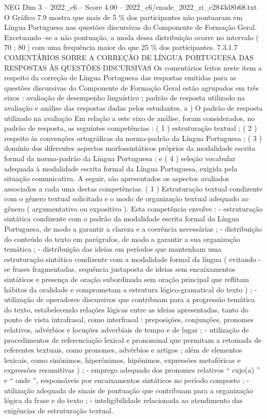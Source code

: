 \begin{textsample}{NEG Dim 3 – 2022\_c6 – Score 4.00 – 2022\_c6/enade\_2022\_ri\_c2843d8b68.txt}
O Gráfico 7.9 mostra que mais de 5 \% dos participantes não pontuaram em Língua Portuguesa nas questões discursivas do Componente de Formação Geral.
Excetuando -se a não pontuação, a moda dessa distribuição ocorre no intervalo ( 70 ; 80 ] com uma frequência maior do que 25 \% dos participantes. 7.3.1.7 COMENTÁRIOS SOBRE A CORREÇÃO DE LÍNGUA PORTUGUESA DAS RESPOSTAS ÀS QUESTÕES DISCURSIVAS Os comentários feitos neste item a respeito da correção de Língua Portuguesa das respostas emitidas para as questões discursivas do Componente de Formação Geral estão agrupados em três eixos : avaliação de desempenho linguístico ; padrão de resposta utilizado na avaliação e análise das respostas dadas pelos estudantes. a ) O padrão de resposta utilizado na avaliação Em relação a este eixo de análise, foram considerados, no padrão de resposta, as seguintes competências : ( 1 ) estruturação textual ; ( 2 ) respeito às convenções ortográficas da norma-padrão da Língua Portuguesa ; ( 3 ) domínio dos diferentes aspectos morfossintáticos próprios da modalidade escrita formal da norma-padrão da Língua Portuguesa ; e ( 4 ) seleção vocabular adequada à modalidade escrita formal da Língua Portuguesa, exigida pela situação comunicativa.
A seguir, são apresentados os aspectos avaliados associados a cada uma destas competências. ( 1 ) Estruturação textual condizente com o gênero textual solicitado e o modo de organização textual adequado ao gênero ( argumentativo ou expositivo ).
Esta competência envolve : - estruturação sintática condizente com o padrão da modalidade escrita formal da Língua Portuguesa, de modo a garantir a clareza e a coerência necessárias ; - distribuição do conteúdo do texto em parágrafos, de modo a garantir a sua organização temática ; - distribuição das ideias em períodos que mantenham uma estruturação sintática condizente com a modalidade formal da língua ( evitando -se frases fragmentadas, sequência justaposta de ideias sem encaixamentos sintáticos e presença de oração subordinada sem oração principal que reflitam hábitos da oralidade e comprometam a estrutura lógico-gramatical do texto ) ; - utilização de operadores discursivos que contribuam para a progressão temática do texto, estabelecendo relações lógicas entre as ideias apresentadas, tanto do ponto de vista intrafrasal, como interfrasal : preposições, conjunções, pronomes relativos, advérbios e locuções adverbiais de tempo e de lugar ; - utilização de procedimentos de referenciação lexical e pronominal que permitam a retomada de referentes textuais, como pronomes, advérbios e artigos ; além de elementos lexicais, como sinônimos, hiperônimos, hipônimos, expressões metafóricas e expressões resumitivas ) ; - emprego adequado dos pronomes relativos “ cujo(a) ” e “ onde ”, responsáveis por encaixamentos sintáticos no período composto ; - utilização adequada de sinais de pontuação que contribuam para a organização lógica da frase e do texto ; - inteligibilidade relacionada ao atendimento das exigências de estruturação textual.

\end{textsample}
